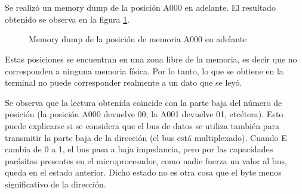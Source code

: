 \documentclass[micros_g1_main.tex]{subfiles}
\begin{document}
\section{}

Se realiz\'o un memory dump de la posici\'on A000 en adelante. El resultado obtenido se observa en la figura \ref{fig:memory-dump}.

\begin{figure}[ht]
	\centering
	\caption{Memory dump de la posici\'on de memoria A000 en adelante}
	\label{fig:memory-dump}
\end{figure}

Estas posiciones se encuentran en una zona libre de la memoria, es decir que no corresponden a ninguna memoria f\'isica. Por lo tanto, lo que se obtiene en la terminal no puede corresponder realmente a un dato que se ley\'o. 

Se observa que la lectura obtenida coincide con la parte baja del n\'umero de posici\'on (la posici\'on A000 devuelve 00, la A001 devuelve 01, etc\'etera). Esto puede explicarse si se considera que el bus de datos se utiliza tambi\'en para transmitir la parte baja de la direcci\'on (el bus est\'a multiplexado). Cuando E cambia de 0 a 1, el bus pasa a baja impedancia, pero por las capacidades par\'asitas presentes en el microprocesador, como nadie fuerza un valor al bus, queda en el estado anterior. Dicho estado no es otra cosa que el byte menos significativo de la direcci\'on.
\end{document}
